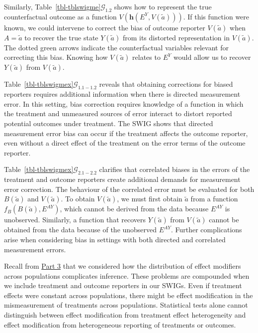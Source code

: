 \documentclass[
  single column]{article}
\begin{document}
Similarly, Table~\ref{tbl-tblswigme}\(\mathcal{G}_{1.2}\) shows how to
represent the true counterfactual outcome as a function
\(V(\mathbf{h}(E^Y, V(\tilde{a})))\). If this function were known, we
could intervene to correct the bias of outcome reporter \(V(\tilde{a})\)
when \(A = \tilde{a}\) to recover the true state \(Y(\tilde{a})\) from
its distorted representation in \(V(\tilde{a})\). The dotted green
arrows indicate the counterfactual variables relevant for correcting
this bias. Knowing how \(V(\tilde{a})\) relates to \(E^Y\) would allow
us to recover \(Y(\tilde{a})\) from \(V(\tilde{a})\).

Table~\ref{tbl-tblswigmex}\(\mathcal{G}_{1.1-1.2}\) reveals that
obtaining corrections for biased reporters requires additional
information when there is directed measurement error. In this setting,
bias correction requires knowledge of a function in which the treatment
and unmeasured sources of error interact to distort reported potential
outcomes under treatment. The SWIG shows that directed measurement error
bias can occur if the treatment affects the outcome reporter, even
without a direct effect of the treatment on the error terms of the
outcome reporter.

Table~\ref{tbl-tblswigmex}\(\mathcal{G}_{2.1-2.2}\) clarifies that
correlated biases in the errors of the treatment and outcome reporters
create additional demands for measurement error correction. The
behaviour of the correlated error must be evaluated for both
\(B(\tilde{a})\) and \(V(\tilde{a})\). To obtain \(V(\tilde{a})\), we
must first obtain \(\tilde{a}\) from a function
\(f_{B}(B(\tilde{a}), E^{AY})\), which cannot be derived from the data
because \(E^{AY}\) is unobserved. Similarly, a function that recovers
\(Y(\tilde{a})\) from \(V(\tilde{a})\) cannot be obtained from the data
because of the unobserved \(E^{AY}\). Further complications arise when
considering bias in settings with both directed and correlated
measurement errors.

Recall from \hyperref[id-sec-3]{Part 3} that we considered how the
distribution of effect modifiers across populations complicates
inference. These problems are compounded when we include treatment and
outcome reporters in our SWIGs. Even if treatment effects were constant
across populations, there might be effect modification in the
mismeasurement of treatments across populations. Statistical tests alone
cannot distinguish between effect modification from treatment effect
heterogeneity and effect modification from heterogeneous reporting of
treatments or outcomes.
\end{document}
